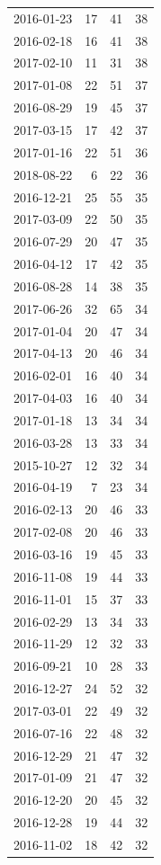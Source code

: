 \begin{tabular}{lrrr}
2016-01-23 & 17 & 41 & 38 \\
2016-02-18 & 16 & 41 & 38 \\
2017-02-10 & 11 & 31 & 38 \\
2017-01-08 & 22 & 51 & 37 \\
2016-08-29 & 19 & 45 & 37 \\
2017-03-15 & 17 & 42 & 37 \\
2017-01-16 & 22 & 51 & 36 \\
2018-08-22 & 6 & 22 & 36 \\
2016-12-21 & 25 & 55 & 35 \\
2017-03-09 & 22 & 50 & 35 \\
2016-07-29 & 20 & 47 & 35 \\
2016-04-12 & 17 & 42 & 35 \\
2016-08-28 & 14 & 38 & 35 \\
2017-06-26 & 32 & 65 & 34 \\
2017-01-04 & 20 & 47 & 34 \\
2017-04-13 & 20 & 46 & 34 \\
2016-02-01 & 16 & 40 & 34 \\
2017-04-03 & 16 & 40 & 34 \\
2017-01-18 & 13 & 34 & 34 \\
2016-03-28 & 13 & 33 & 34 \\
2015-10-27 & 12 & 32 & 34 \\
2016-04-19 & 7 & 23 & 34 \\
2016-02-13 & 20 & 46 & 33 \\
2017-02-08 & 20 & 46 & 33 \\
2016-03-16 & 19 & 45 & 33 \\
2016-11-08 & 19 & 44 & 33 \\
2016-11-01 & 15 & 37 & 33 \\
2016-02-29 & 13 & 34 & 33 \\
2016-11-29 & 12 & 32 & 33 \\
2016-09-21 & 10 & 28 & 33 \\
2016-12-27 & 24 & 52 & 32 \\
2017-03-01 & 22 & 49 & 32 \\
2016-07-16 & 22 & 48 & 32 \\
2016-12-29 & 21 & 47 & 32 \\
2017-01-09 & 21 & 47 & 32 \\
2016-12-20 & 20 & 45 & 32 \\
2016-12-28 & 19 & 44 & 32 \\
2016-11-02 & 18 & 42 & 32 \\

\end{tabular}
